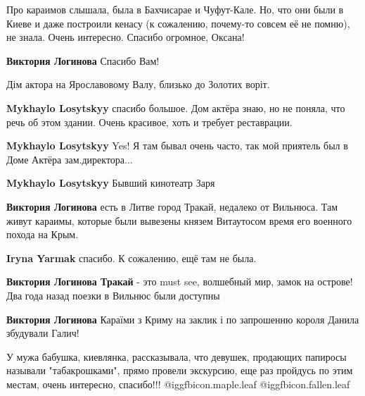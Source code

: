 \begin{itemize}

Про караимов слышала, была в Бахчисарае и Чуфут-Кале. Но, что они были в Киеве
и даже построили кенасу (к сожалению, почему-то совсем её не помню), не знала.
Очень интересно. Спасибо огромное, Оксана!

\begin{itemize} %
\textbf{Виктория Логинова} Спасибо Вам!

Дім актора на Ярославовому Валу, близько до Золотих воріт.

\begin{itemize} %
\textbf{Mykhaylo Losytskyy} спасибо большое. Дом актёра знаю, но не поняла, что речь об этом здании. Очень красивое, хоть и требует реставрации.

\textbf{Mykhaylo Losytskyy} Yes! Я там бывал очень часто, так мой приятель был в Доме Актёра зам.директора...

\textbf{Mykhaylo Losytskyy} Бывший кинотеатр Заря
\end{itemize} %

\textbf{Виктория Логинова} есть в Литве город Тракай, недалеко от Вильнюса. Там живут караимы, которые были вывезены князем Витаутосом время его военного похода на Крым.

\begin{itemize} %
\textbf{Iryna Yarmak} спасибо. К сожалению, ещё там не была.

\textbf{Виктория Логинова Тракай} - это must see, волшебный мир, замок на острове! Два года назад поезки в Вильнюс были доступны
\end{itemize} %

\textbf{Виктория Логинова} Караїми з Криму на заклик і по запрошенню короля Данила збудували Галич!
\end{itemize} %


У мужа бабушка, киевлянка, рассказывала, что девушек, продающих папиросы
называли "табакрошками", прямо провели экскурсию, еще раз пройдусь по этим
местам, очень интересно, спасибо!!! @igg{fbicon.maple.leaf}  @igg{fbicon.fallen.leaf} 🎩

\end{itemize} %
